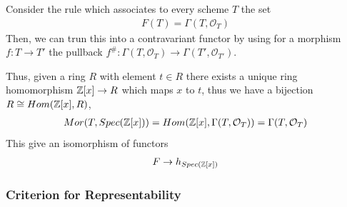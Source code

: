 \documentclass[Total.tex]{subfiles}
\begin{document}
			\begin{example}
				Consider the rule which associates to every scheme $T$ the set
				\begin{gather*}
					F(T)=\Gamma(T,\mathcal{O}_T)
				\end{gather*}
				Then, we can trun this into a contravariant functor by using for a morphism $f:T\rightarrow T'$ the pullback $f^\#:\Gamma(T,\mathcal{O}_{T})\rightarrow \Gamma(T',\mathcal{O}_{T'})$. 
				
				Thus, given a ring $R$ with element $t\in R$ there exists a unique ring homomorphism $\mathbb{Z}[x]\rightarrow R$ which maps $x$ to $t$, thus we have a bijection $R\cong Hom(\mathbb{Z}[x],R)$,
				\begin{gather*}
					Mor(T,Spec(\mathbb{Z}[x]))=Hom(\mathbb{Z}[x],\Gamma(T,\mathcal{O}_T))=\Gamma(T,\mathcal{O}_T)
				\end{gather*}
				This give an isomorphism of functors
				\begin{gather*}
					F\rightarrow h_{Spec(\mathbb{Z}[x])}
				\end{gather*}
			\end{example}
			
			
			
			\subsubsection{Criterion for Representability}
			
\end{document}
